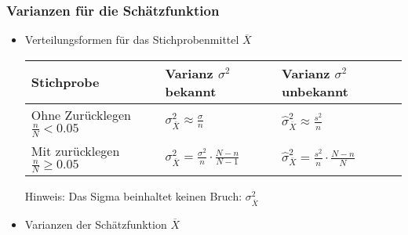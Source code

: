 \subsubsection{Varianzen für die Schätzfunktion}
\begin{itemize}
\item Verteilungsformen für das Stichprobenmittel $\overline{X}$
\begin{table}[h]
\centering
\begin{tabular}{@{}lll@{}}
\toprule
Stichprobe & Varianz $\sigma^2$ bekannt & Varianz $\sigma^2$ unbekannt \\ \midrule
Ohne Zurücklegen $\frac{n}{N}<0.05$ & $\displaystyle\sigma_{\overline{X}}^2\approx\frac{\sigma}{n}$ & $\displaystyle\widehat{\sigma}_{\overline{X}}^2\approx\frac{s^2}{n}$ \\ 
Mit zurücklegen $\frac{n}{N} \geq 0.05$ & $\displaystyle\sigma_{\overline{X}}^2=\frac{\sigma^2}{n}\cdot\frac{N-n}{N-1}$ & $\displaystyle\widehat{\sigma}_{\overline{X}}^2 =\frac{s^2}{n}\cdot\frac{N-n}{N}$ \\ \bottomrule
\end{tabular}
\end{table}
Hinweis: Das Sigma beinhaltet keinen Bruch: $\sigma_{\overline{X}}^2$
\item Varianzen der Schätzfunktion $\overline{X}$
\newpage

\end{itemize}
